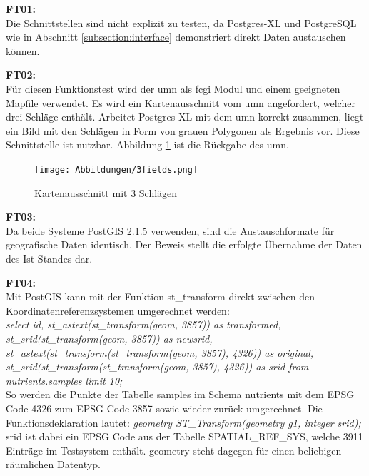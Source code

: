 
\textbf{FT01:}\\
Die Schnittstellen sind nicht explizit zu testen, da Postgres-XL und PostgreSQL wie in Abschnitt \ref{subsection:interface} demonstriert direkt Daten austauschen können.

\textbf{FT02:}\\
Für diesen Funktionstest wird der \Gls{umn} als \Gls{fcgi} Modul und einem geeigneten Mapfile verwendet.
Es wird ein Kartenausschnitt vom \Gls{umn} angefordert, welcher drei Schläge enthält.
Arbeitet Postgres-XL mit dem \Gls{umn} korrekt zusammen, liegt ein Bild mit den Schlägen in Form von  grauen Polygonen als Ergebnis vor.
Diese Schnittstelle ist nutzbar.
Abbildung \ref{fig:3fields} ist die Rückgabe des \Gls{umn}.
\begin{figure}[h!]
\centering
\texttt{[image: Abbildungen/3fields.png]}
\caption[Kartenausschnitt mit 3 Schlägen]{Kartenausschnitt mit 3 Schlägen}
\label{fig:3fields}
\end{figure}

\textbf{FT03:}\\
Da beide Systeme PostGIS 2.1.5 verwenden, sind die Austauschformate für geografische Daten identisch.
Der Beweis stellt die erfolgte Übernahme der Daten des Ist-Standes dar.

\textbf{FT04:}\\
Mit PostGIS kann mit der Funktion st\_{}transform direkt zwischen den Koordinatenreferenzsystemen umgerechnet werden:\\
\textit{select id, st\_{}astext(st\_{}transform(geom, 3857)) as transformed, st\_{}srid(st\_{}transform(geom, 3857)) as newsrid, st\_{}astext(st\_{}transform(st\_{}transform(geom, 3857), 4326)) as original, st\_{}srid(st\_{}transform(st\_{}transform(geom, 3857), 4326)) as srid from nutrients.samples limit 10;}\\
So werden die Punkte der Tabelle samples im Schema nutrients mit dem EPSG Code 4326 zum EPSG Code 3857 sowie wieder zurück umgerechnet.
Die Funktionsdeklaration lautet:
\textit{geometry ST\_{}Transform(geometry g1, integer srid);}\\
srid ist dabei ein EPSG Code aus der Tabelle SPATIAL\_{}REF\_{}SYS, welche 3911 Einträge im Testsystem enthält.
geometry steht dagegen für einen beliebigen räumlichen Datentyp.

